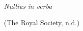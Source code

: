 \documentclass[
  12pt,
  a4paper,
  oneside]{tesesusp}
\begin{document}

\begin{epigrafe}
  \vspace*{\fill}
	\begin{flushright}
\emph{Nullius in verba}

(The Royal Society, n.d.)
	\end{flushright}
\end{epigrafe}

\end{document}

